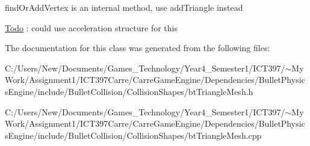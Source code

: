 findOrAddVertex is an internal method, use addTriangle instead 



\begin{Desc}
\item[\hyperlink{todo__todo000024}{Todo}]: could use acceleration structure for this \end{Desc}


The documentation for this class was generated from the following files:\begin{CompactItemize}
\item 
C:/Users/New/Documents/Games\_\-Technology/Year4\_\-Semester1/ICT397/$\sim$My Work/Assignment1/ICT397Carre/CarreGameEngine/Dependencies/BulletPhysicsEngine/include/BulletCollision/CollisionShapes/btTriangleMesh.h\item 
C:/Users/New/Documents/Games\_\-Technology/Year4\_\-Semester1/ICT397/$\sim$My Work/Assignment1/ICT397Carre/CarreGameEngine/Dependencies/BulletPhysicsEngine/include/BulletCollision/CollisionShapes/btTriangleMesh.cpp\end{CompactItemize}
